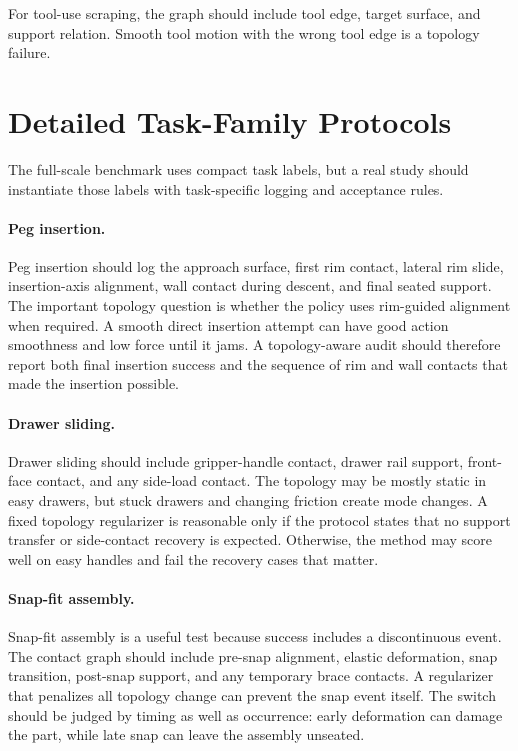 \documentclass{article}
\begin{document}
For tool-use scraping, the graph should include tool edge, target surface, and support relation. Smooth tool motion with the wrong tool edge is a topology failure.

\section{Detailed Task-Family Protocols}

The full-scale benchmark uses compact task labels, but a real study should instantiate those labels with task-specific logging and acceptance rules.

\paragraph{Peg insertion.}
Peg insertion should log the approach surface, first rim contact, lateral rim slide, insertion-axis alignment, wall contact during descent, and final seated support. The important topology question is whether the policy uses rim-guided alignment when required. A smooth direct insertion attempt can have good action smoothness and low force until it jams. A topology-aware audit should therefore report both final insertion success and the sequence of rim and wall contacts that made the insertion possible.

\paragraph{Drawer sliding.}
Drawer sliding should include gripper-handle contact, drawer rail support, front-face contact, and any side-load contact. The topology may be mostly static in easy drawers, but stuck drawers and changing friction create mode changes. A fixed topology regularizer is reasonable only if the protocol states that no support transfer or side-contact recovery is expected. Otherwise, the method may score well on easy handles and fail the recovery cases that matter.

\paragraph{Snap-fit assembly.}
Snap-fit assembly is a useful test because success includes a discontinuous event. The contact graph should include pre-snap alignment, elastic deformation, snap transition, post-snap support, and any temporary brace contacts. A regularizer that penalizes all topology change can prevent the snap event itself. The switch should be judged by timing as well as occurrence: early deformation can damage the part, while late snap can leave the assembly unseated.
\end{document}
